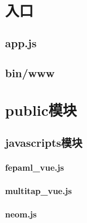 
\section{入口}
\subsection{app.js}

\subsection{bin/www}

\section{public模块}
\subsection{javascripts模块}
% 
\subsubsection{fepaml\_vue.js}

\subsubsection{multitap\_vue.js}

\subsubsection{neom.js}

